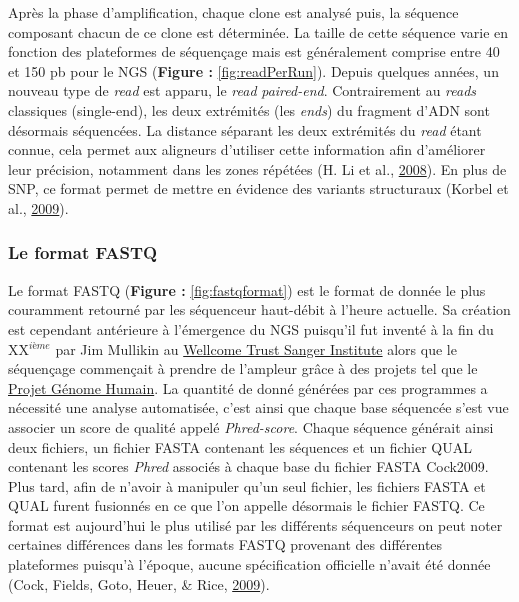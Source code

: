 \documentclass[12pt,twoside]{reedthesis}
\theoremstyle{definition}
\theoremstyle{definition}
\theoremstyle{remark}
\begin{document}
  Après la phase d'amplification, chaque clone est analysé puis, la
  séquence composant chacun de ce clone est déterminée. La taille de cette
  séquence varie en fonction des plateformes de séquençage mais est
  généralement comprise entre 40 et 150 pb pour le NGS (\textbf{Figure :
  }\ref{fig:readPerRun}). Depuis quelques années, un nouveau type de
  \emph{read} est apparu, le \emph{read} \emph{paired-end}. Contrairement
  au \emph{reads} classiques (single-end), les deux extrémités (les
  \emph{ends}) du fragment d'ADN sont désormais séquencées. La distance
  séparant les deux extrémités du \emph{read} étant connue, cela permet
  aux aligneurs d'utiliser cette information afin d'améliorer leur
  précision, notamment dans les zones répétées (H. Li et al.,
  \protect\hyperlink{ref-Li2008}{2008}). En plus de SNP, ce format permet
  de mettre en évidence des variants structuraux (Korbel et al.,
  \protect\hyperlink{ref-Korbel2009}{2009}).
  
  \subsubsection{Le format FASTQ}\label{le-format-fastq}
  
  Le format FASTQ (\textbf{Figure : }\ref{fig:fastqformat}) est le format
  de donnée le plus couramment retourné par les séquenceur haut-débit à
  l'heure actuelle. Sa création est cependant antérieure à l'émergence du
  NGS puisqu'il fut inventé à la fin du XX\(^{ième}\) par Jim Mullikin au
  \href{https://fr.wikipedia.org/wiki/Wellcome_Trust_Sanger_Institute}{Wellcome
  Trust Sanger Institute} alors que le séquençage commençait à prendre de
  l'ampleur grâce à des projets tel que le
  \href{https://fr.wikipedia.org/wiki/Projet_G\%C3\%A9nome_Humain}{Projet
  Génome Humain}. La quantité de donné générées par ces programmes a
  nécessité une analyse automatisée, c'est ainsi que chaque base séquencée
  s'est vue associer un score de qualité appelé \emph{Phred-score}. Chaque
  séquence générait ainsi deux fichiers, un fichier FASTA contenant les
  séquences et un fichier QUAL contenant les scores \emph{Phred} associés
  à chaque base du fichier FASTA Cock2009. Plus tard, afin de n'avoir à
  manipuler qu'un seul fichier, les fichiers FASTA et QUAL furent
  fusionnés en ce que l'on appelle désormais le fichier FASTQ. Ce format
  est aujourd'hui le plus utilisé par les différents séquenceurs on peut
  noter certaines différences dans les formats FASTQ provenant des
  différentes plateformes puisqu'à l'époque, aucune spécification
  officielle n'avait été donnée (Cock, Fields, Goto, Heuer, \& Rice,
  \protect\hyperlink{ref-Cock2009}{2009}).
  
\end{document}
